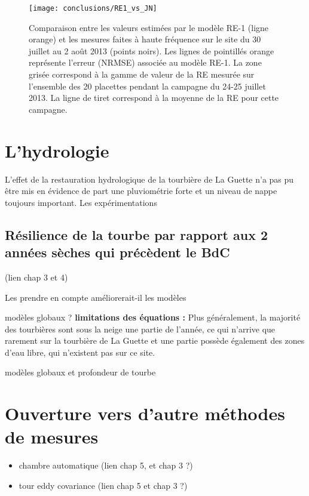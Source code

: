 \begin{figure}
\centering
\texttt{[image: conclusions/RE1\_vs\_JN]}
\caption{Comparaison entre les valeurs estimées par le modèle RE-1 (ligne orange) et les mesures faites à haute fréquence sur le site du 30 juillet au 2 août 2013 (points noirs). Les lignes de pointillés orange représente l'erreur (NRMSE) associée au modèle RE-1. La zone grisée correspond à la gamme de valeur de la RE mesurée sur l'ensemble des 20 placettes pendant la campagne du 24-25 juillet 2013. La ligne de tiret correspond à la moyenne de la RE pour cette campagne.}
\label{fig:RE1_vs_JN}
\end{figure}


\section{L'hydrologie}

L'effet de la restauration hydrologique de la tourbière de La Guette n'a pas pu être mis en évidence de part une pluviométrie forte et un niveau de nappe toujours important.
Les expérimentations

\subsection{Résilience de la tourbe par rapport aux 2 années sèches qui précèdent le BdC}
(lien chap 3 et 4)

%
%
%
%


Les prendre en compte améliorerait-il les modèles

modèles globaux ?
\textbf{limitations des équations :}
Plus généralement, la majorité des tourbières sont sous la neige une partie de l'année, ce qui n'arrive que rarement sur la tourbière de La Guette et une partie possède également des zones d'eau libre, qui n'existent pas sur ce site.

modèles globaux et profondeur de tourbe


\section{Ouverture vers d'autre méthodes de mesures}
\begin{itemize}
\item chambre automatique (lien chap 5, et chap 3 ?)
\item tour eddy covariance (lien chap 5 et chap 3 ?)
\end{itemize}

